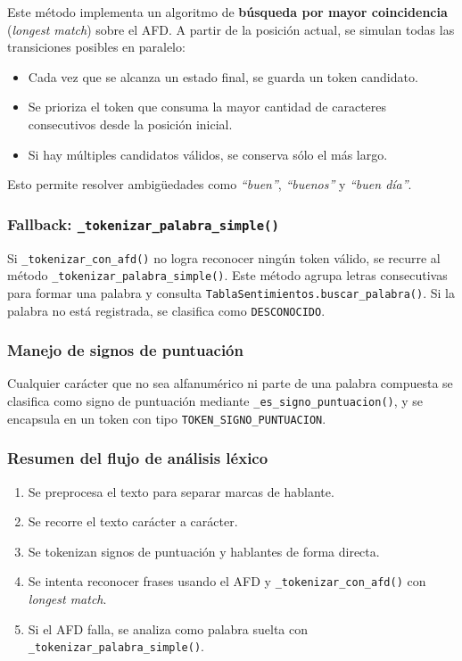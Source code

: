 Este método implementa un algoritmo de \textbf{búsqueda por mayor coincidencia}
(\textit{longest match}) sobre el AFD. A partir de la posición actual, se simulan todas las
transiciones posibles en paralelo:

\begin{itemize}
	\item Cada vez que se alcanza un estado final, se guarda un token candidato.
	\item Se prioriza el token que consuma la mayor cantidad de caracteres consecutivos desde la posición inicial.
	\item Si hay múltiples candidatos válidos, se conserva sólo el más largo.
\end{itemize}

Esto permite resolver ambigüedades como \textit{``buen''}, \textit{``buenos''} y \textit{``buen
	día''}.

\subsubsection{Fallback: \texttt{\_tokenizar\_palabra\_simple()}}
Si \texttt{\_tokenizar\_con\_afd()} no logra reconocer ningún token válido, se recurre al
método \texttt{\_tokenizar\_palabra\_simple()}. Este método agrupa letras consecutivas para
formar una palabra y consulta \texttt{TablaSentimientos.buscar\_palabra()}. Si la palabra no
está registrada, se clasifica como \texttt{DESCONOCIDO}.

\subsubsection{Manejo de signos de puntuación}
Cualquier carácter que no sea alfanumérico ni parte de una palabra compuesta se clasifica como
signo de puntuación mediante \texttt{\_es\_signo\_puntuacion()}, y se encapsula en un token con
tipo \texttt{TOKEN\_SIGNO\_PUNTUACION}.

\subsubsection{Resumen del flujo de análisis léxico}
\begin{enumerate}
	\item Se preprocesa el texto para separar marcas de hablante.
	\item Se recorre el texto carácter a carácter.
	\item Se tokenizan signos de puntuación y hablantes de forma directa.
	\item Se intenta reconocer frases usando el AFD y \texttt{\_tokenizar\_con\_afd()} con \textit{longest match}.
	\item Si el AFD falla, se analiza como palabra suelta con \texttt{\_tokenizar\_palabra\_simple()}.
\end{enumerate}

